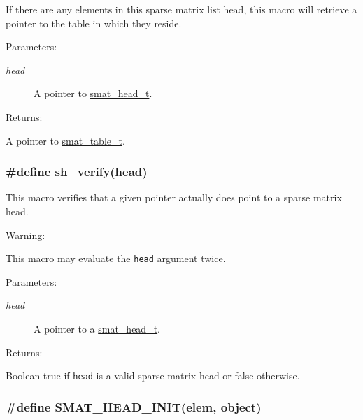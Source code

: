 If there are any elements in this sparse matrix list head, this macro will retrieve a pointer to the table in which they reside.\begin{Desc}
\item[Parameters: ]\par
\begin{description}
\item[{\em 
head}]A pointer to \hyperlink{group__dbprim__smat_a1}{smat\_\-head\_\-t}.\end{description}
\end{Desc}
\begin{Desc}
\item[Returns: ]\par
A pointer to \hyperlink{group__dbprim__smat_a0}{smat\_\-table\_\-t}. \end{Desc}
\hypertarget{group__dbprim__smat_a29}{
\subsubsection[sh\_\-verify]{\setlength{\rightskip}{0pt plus 5cm}\#define sh\_\-verify(head)}}
\label{group__dbprim__smat_a29}


This macro verifies that a given pointer actually does point to a sparse matrix head.

\begin{Desc}
\item[Warning: ]\par
This macro may evaluate the {\tt head} argument twice.\end{Desc}
\begin{Desc}
\item[Parameters: ]\par
\begin{description}
\item[{\em 
head}]A pointer to a \hyperlink{group__dbprim__smat_a1}{smat\_\-head\_\-t}.\end{description}
\end{Desc}
\begin{Desc}
\item[Returns: ]\par
Boolean true if {\tt head} is a valid sparse matrix head or false otherwise. \end{Desc}
\hypertarget{group__dbprim__smat_a28}{
\subsubsection[SMAT\_\-HEAD\_\-INIT]{\setlength{\rightskip}{0pt plus 5cm}\#define SMAT\_\-HEAD\_\-INIT(elem, object)}}
\label{group__dbprim__smat_a28}


